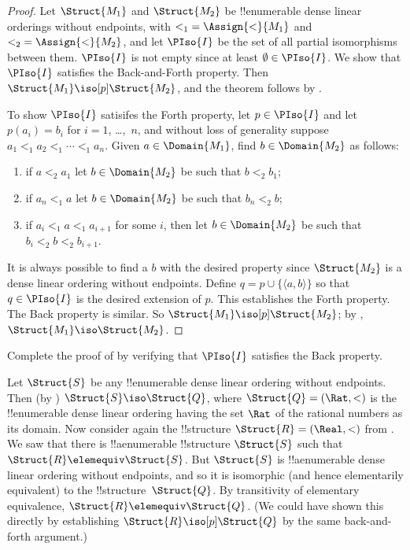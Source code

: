 \documentclass[../../../include/open-logic-section]{subfiles}
\begin{document}
\begin{proof}
  Let $\Struct{M_1}$ and $\Struct{M_2}$ be !!{enumerable} dense linear
  orderings without endpoints, with ${<_1} = \Assign{<}{M_1}$ and ${<_2} =
  \Assign{<}{M_2}$, and let $\PIso{I}$ be the set of all partial
  isomorphisms between them. $\PIso{I}$ is not empty since at least
  $\emptyset \in \PIso{I}$. We show that $\PIso{I}$ satisfies the
  Back-and-Forth property.  Then $\Struct{M_1} \iso[p] \Struct{M_2}$,
  and the theorem follows by .

  To show $\PIso{I}$ satisifes the Forth property, let $p \in
  \PIso{I}$ and let $p(a_i) = b_i$ for $i = 1$, \dots,~$n$, and
  without loss of generality suppose $a_1 <_1 a_2 <_1 \cdots <_1
  a_n$. Given $a \in \Domain{M_1}$, find $b \in \Domain{M_2}$ as
  follows:
  \begin{enumerate}
  \item if $a <_2 a_1$ let $b \in \Domain{M_2}$ be such that $b <_2
    b_1$;
  \item if $a_n <_1 a$ let $b \in \Domain{M_2}$ be such that $b_n <_2 b$;
 \item if $a_i <_1 a <_1 a_{i+1}$ for some $i$, then let $b \in
   \Domain{M_2}$ be such that $b_i <_2 b <_2 b_{i+1}$.
  \end{enumerate}
  It is always possible to find a $b$ with the desired property since
  $\Struct{M_2}$ is a dense linear ordering without endpoints. Define
  $q = p \cup \{ \langle a, b \rangle \}$ so that $q \in \PIso{I}$ is
  the desired extension of $p$. This establishes the Forth
  property. The Back property is similar. So $\Struct{M_1} \iso[p]
  \Struct{M_2}$; by , $\Struct{M_1} \iso
  \Struct{M_2}$.
\end{proof}

\begin{prob}
  Complete the proof of  by
  verifying that $\PIso{I}$ satisfies the Back property.
\end{prob}

\begin{rem}
  Let $\Struct{S}$ be any !!{enumerable} dense linear ordering without
  endpoints. Then (by ) $\Struct{S} \iso
  \Struct{Q}$, where $\Struct{Q} = (\Rat, <)$ is the !!{enumerable}
  dense linear ordering having the set $\Rat$ of the rational numbers
  as its domain. Now consider again the !!{structure} $\Struct{R} =
  (\Real, <)$ from . We saw that there is
  !!a{enumerable} !!{structure} $\Struct{S}$ such that $\Struct{R}
  \elemequiv \Struct{S}$. But $\Struct{S}$ is !!a{enumerable} dense
  linear ordering without endpoints, and so it is isomorphic (and
  hence elementarily equivalent) to the !!{structure}~$\Struct{Q}$. By
  transitivity of elementary equivalence, $\Struct{R} \elemequiv
  \Struct{Q}$. (We could have shown this directly by establishing
  $\Struct{R} \iso[p] \Struct{Q}$ by the same back-and-forth
  argument.)
\end{rem}
\end{document}
